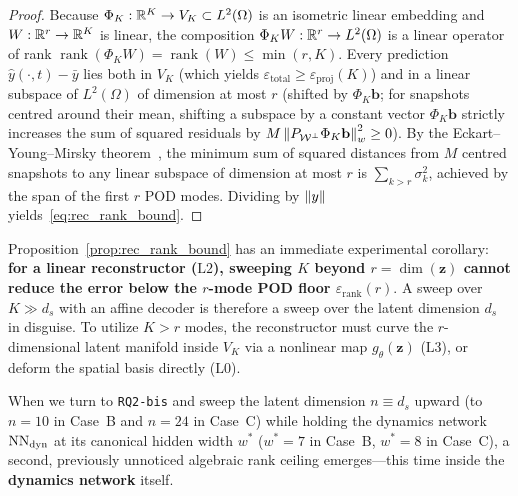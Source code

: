 \begin{proof}
Because $\Phi_K : \mathbb{R}^K \to V_K \subset L^2(\Omega)$ is an isometric linear embedding and $W : \mathbb{R}^r \to \mathbb{R}^K$ is linear, the composition $\Phi_K W : \mathbb{R}^r \to L^2(\Omega)$ is a linear operator of rank $\operatorname{rank}(\Phi_K W) = \operatorname{rank}(W) \le \min(r, K)$. Every prediction $\hat{y}(\cdot,t) - \bar{y}$ lies both in $V_K$ (which yields $\varepsilon_{\mathrm{total}} \ge \varepsilon_{\mathrm{proj}}(K)$) and in a linear subspace of $L^2(\Omega)$ of dimension at most $r$ (shifted by $\Phi_K\mathbf{b}$; for snapshots centred around their mean, shifting a subspace by a constant vector $\Phi_K\mathbf{b}$ strictly increases the sum of squared residuals by $M\left\lVert P_{\mathcal{W}^\perp}\Phi_K\mathbf{b} \right\rVert_w^2 \ge 0$). By the Eckart--Young--Mirsky theorem~\cite{eckart1936approximation,mirsky1960symmetric}, the minimum sum of squared distances from $M$ centred snapshots to any linear subspace of dimension at most $r$ is $\sum_{k > r} \sigma_k^2$, achieved by the span of the first $r$ POD modes. Dividing by $\left\lVert y \right\rVert$ yields~\eqref{eq:rec_rank_bound}.
\end{proof}

Proposition~\ref{prop:rec_rank_bound} has an immediate experimental corollary: \textbf{for a linear reconstructor ($\mathrm{L2}$), sweeping $K$ beyond $r = \dim(\mathbf{z})$ cannot reduce the error below the $r$-mode POD floor $\varepsilon_{\mathrm{rank}}(r)$}. A sweep over $K \gg d_s$ with an affine decoder is therefore a sweep over the latent dimension $d_s$ in disguise. To utilize $K > r$ modes, the reconstructor must curve the $r$-dimensional latent manifold inside $V_K$ via a nonlinear map $g_\theta(\mathbf{z})$ ($\mathrm{L3}$), or deform the spatial basis directly ($\mathrm{L0}$).

When we turn to \texttt{RQ2-bis} and sweep the latent dimension $n \equiv d_s$ upward (to $n=10$ in Case~B and $n=24$ in Case~C) while holding the dynamics network $\mathrm{NN}_{\mathrm{dyn}}$ at its canonical hidden width $w^*$ ($w^* = 7$ in Case~B, $w^* = 8$ in Case~C), a second, previously unnoticed algebraic rank ceiling emerges---this time inside the \textbf{dynamics network} itself.

